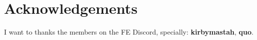 \documentclass[a4paper]{report}
\begin{document}
\newcommand{\ikef}{\item \ike:}
\newcommand{\oscarf}{\item \oscar:}
\newcommand{\titaniaf}{\item \titania:}
\newcommand{\rhysf}{\item \rhys:}
\newcommand{\gatrief}{\item \gatrie:}
\newcommand{\shinonf}{\item \shinon:}
\newcommand{\sorenf}{\item \soren:}
\newcommand{\boydf}{\item \boyd:}
\newcommand{\miaf}{\item \mia:}
\newcommand{\marciaf}{\item \marcia:}
\newcommand{\volkef}{\item \volke:}
\newcommand{\astridf}{\item \astrid:}
\newcommand{\lethef}{\item \lethe:}
\newcommand{\mordecaif}{\item \mordecai:}
\newcommand{\tanithf}{\item \tanith:}
\newcommand{\reysonf}{\item \reyson:}
\newcommand{\ulkif}{\item \ulki:}
\newcommand{\calillf}{\item \calill:}
\newcommand{\tauroneof}{\item \tauroneo:}
\newcommand{\muarimf}{\item \muarim:}
\newcommand{\largof}{\item \largo:}


\setlength{\columnsep}{.5cm}

\section*{Acknowledgements}

I want to thanks the members on the FE Discord, specially: \textbf{kirbymastah}, \textbf{quo}.



\newpage
\begin{multicols}{2}








\end{multicols}


\begin{multicols}{2}

















\end{multicols}






\end{document}
